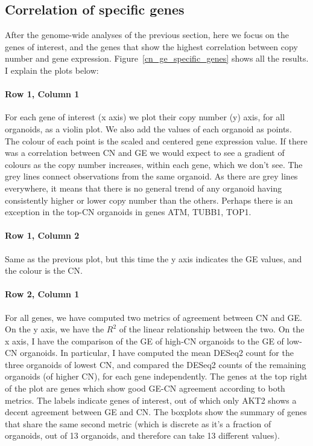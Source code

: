 \documentclass{article}
\begin{document}
\clearpage
\subsection{Correlation of specific genes}
After the genome-wide analyses of the previous section, here we focus on the genes of interest, and the genes that show the highest correlation between copy number and gene expression. Figure~\ref{cn_ge_specific_genes} shows all the results. I explain the plots below:

\paragraph{Row 1, Column 1} For each gene of interest (x axis) we plot their copy number (y) axis, for all organoids, as a violin plot. We also add the values of each organoid as points. The colour of each point is the scaled and centered gene expression value. If there was a correlation between CN and GE we would expect to see a gradient of colours as the copy number increases, within each gene, which we don't see. The grey lines connect observations from the same organoid. As there are grey lines everywhere, it means that there is no general trend of any organoid having consistently higher or lower copy number than the others. Perhaps there is an exception in the top-CN organoids in genes ATM, TUBB1, TOP1.

\paragraph{Row 1, Column 2} Same as the previous plot, but this time the y axis indicates the GE values, and the colour is the CN.

\paragraph{Row 2, Column 1} For all genes, we have computed two metrics of agreement between CN and GE. On the y axis, we have the $R^2$ of the linear relationship between the two. On the x axis, I have the comparison of the GE of high-CN organoids to the GE of low-CN organoids. In particular, I have computed the mean DESeq2 count for the three organoids of lowest CN, and compared the DESeq2 counts of the remaining organoids (of higher CN), for each gene independently. The genes at the top right of the plot are genes which show good GE-CN agreement according to both metrics. The labels indicate genes of interest, out of which only AKT2 shows a decent agreement between GE and CN. The boxplots show the summary of genes that share the same second metric (which is discrete as it's a fraction of organoids, out of 13 organoids, and therefore can take 13 different values).
\end{document}
